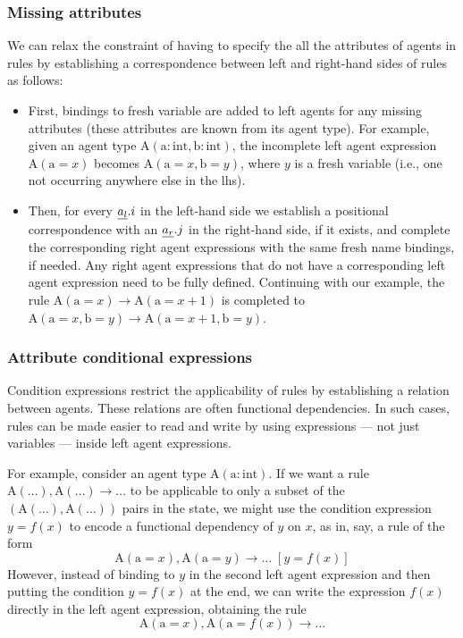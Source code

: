\subsubsection*{Missing attributes} \label{sec:syntaxExt} We can relax the constraint of having to specify the all the attributes %
of agents in rules by establishing %
a correspondence between left and right-hand sides of rules as follows:
%
\begin{itemize}
\item First, bindings to fresh variable are added to left agents for any missing attributes (these attributes are known from its agent type).
%
%
For example, given an agent type $\mathrm{A}(\mathrm{a}: \mathrm{int}, \mathrm{b} : \mathrm{int})$, the incomplete left agent expression $\mathrm{A}(\mathrm{a}=x)$ becomes $\mathrm{A}(\mathrm{a}=x, \mathrm{b}= y)$, where $y$ is a fresh variable %
(i.e., one not occurring anywhere else in the lhs). 

\item Then, for every $\underline{a_l}.i$ in the left-hand side we establish a
  positional correspondence with an $\underline{a_r}.j$ in the right-hand side, if it
  exists, and complete the corresponding right agent expressions with the same
  fresh name bindings, if needed.  Any right agent expressions that do not have
  a corresponding left agent expression need to be fully defined. Continuing
  with our example, the rule
  $\mathrm{A}(\mathrm{a}=x) \rightarrow \mathrm{A}(\mathrm{a}=x+1)$ is completed
  to
  $\mathrm{A}(\mathrm{a}=x, \mathrm{b}= y) \rightarrow \mathrm{A}(\mathrm{a}=x +
  1, \mathrm{b}= y)$.
\end{itemize}
\subsubsection*{Attribute conditional expressions} 
Condition expressions restrict the applicability of rules by establishing a
relation between agents. These relations are often functional dependencies. In
such cases, rules can be made easier to read and write by using expressions ---
not just variables --- inside left agent expressions.

For example, consider an agent type $\mathrm{A}(\mathrm{a}:\mathrm{int})$. If we
want a rule $\mathrm{A}(\dots), \mathrm{A}(\dots) \rightarrow \dots$ to be applicable to only a subset
of the $(\mathrm{A}(\dots), \mathrm{A}(\dots))$ pairs in the state, we might use the
condition expression $y = f(x)$ to encode a functional dependency of $y$ on $x$,
as in, say, a rule of the form
%
\[\mathrm{A}(\mathrm{a}=x), \mathrm{A}(\mathrm{a}=y) \rightarrow \dots \; [y = f(x)]\]
%
However, instead of binding to $y$ in the second left agent expression and then
putting the condition $y = f(x)$ at the end, we can write the expression $f(x)$
directly in the left agent expression, obtaining the rule
%
\[\mathrm{A}(\mathrm{a}=x), \mathrm{A}(\mathrm{a}=f(x)) \rightarrow \dots\]


